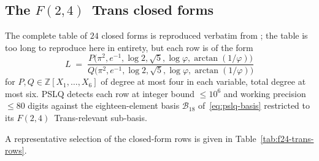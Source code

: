 \documentclass[11pt,reqno]{amsart}
\theoremstyle{definition}
\begin{document}
\subsection{The $F(2,4)$~Trans closed forms}\label{app:closed-forms}

The complete table of $24$ closed forms is reproduced verbatim
from \cite[Appendix~B]{Papanokechi2026F24}; the table is too
long to reproduce here in entirety, but each row is of the
form
\[
L \;=\; \frac{P\big(\pi^{2}, e^{-1}, \log 2, \sqrt{5},
\log\varphi, \arctan(1/\varphi)\big)}{
       Q\big(\pi^{2}, e^{-1}, \log 2, \sqrt{5},
            \log\varphi, \arctan(1/\varphi)\big)}
\]
for $P,Q\in\mathbb{Z}[X_{1},\ldots,X_{6}]$ of degree at most
four in each variable, total degree at most six. PSLQ
detects each row at integer bound $\le 10^{6}$ and working
precision $\le 80$ digits against the eighteen-element basis
$\mathcal{B}_{18}$ of~\eqref{eq:pslq-basis} restricted to its
$F(2,4)$~Trans-relevant sub-basis.

A representative selection of the closed-form rows is given
in Table~\ref{tab:f24-trans-rows}.
\end{document}
